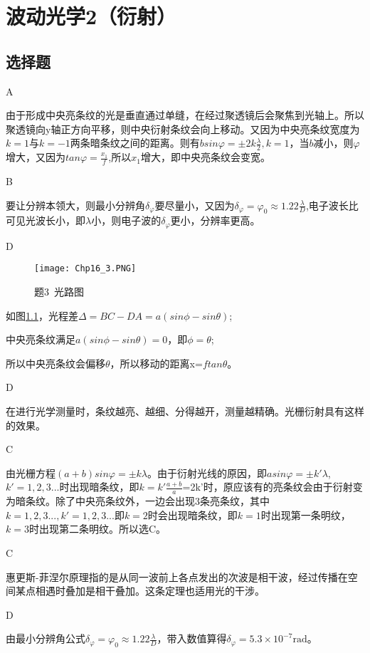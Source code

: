 \chapter{波动光学2（衍射）}
\section{选择题}
\exercise A

\solve
由于形成中央亮条纹的光是垂直通过单缝，在经过聚透镜后会聚焦到光轴上。所以聚透镜向y轴正方向平移，则中央衍射条纹会向上移动。又因为中央亮条纹宽度为$k=1$与$k=-1$两条暗条纹之间的距离。则有$bsin\varphi=\pm2k\frac{\lambda}{2},k=1$，当$b$减小，则$\varphi$增大，又因为$tan\varphi=\frac{x_1}{f}$,所以$x_1$增大，即中央亮条纹会变宽。

\exercise B

\solve
要让分辨本领大，则最小分辨角$\delta_\varphi$要尽量小，又因为$\delta_\varphi=\varphi_0\approx1.22\frac{\lambda}{D}$,电子波长比可见光波长小，即$\lambda$小，则电子波的$\delta_\varphi$更小，分辨率更高。

\exercise D

\solve
\begin{figure}[htbp]
\centering
\texttt{[image: Chp16\_3.PNG]}
\caption{题3\ 光路图}\label{fig:16_3}
\end{figure}
如图\ref{fig:16_3}，光程差$\Delta=BC-DA=a(sin\phi-sin\theta)$;

中央亮条纹满足$a(sin\phi-sin\theta)=0$，即$\phi=\theta$;

所以中央亮条纹会偏移$\theta$，所以移动的距离x=$ftan\theta$。

\exercise D

\solve
在进行光学测量时，条纹越亮、越细、分得越开，测量越精确。光栅衍射具有这样的效果。

\exercise C

\solve
由光栅方程$(a+b)sin\varphi=\pm k\lambda$。由于衍射光线的原因，即$asin\varphi=\pm k'\lambda$,$k'=1,2,3...$时出现暗条纹，即$k=k'\frac{a+b}{a}$=2k'时，原应该有的亮条纹会由于衍射变为暗条纹。除了中央亮条纹外，一边会出现3条亮条纹，其中$k=1,2,3...,k'=1,2,3...$即$k=2$时会出现暗条纹，即$k=1$时出现第一条明纹，$k=3$时出现第二条明纹。所以选C。

\exercise C

\solve
惠更斯-菲涅尔原理指的是从同一波前上各点发出的次波是相干波，经过传播在空间某点相遇时叠加是相干叠加。这条定理也适用光的干涉。

\exercise D

\solve
由最小分辨角公式$\delta_\varphi=\varphi_0\approx1.22\frac{\lambda}{D}$，带入数值算得$\delta_\varphi=5.3\times10^{-7}\mathrm{rad}$。

